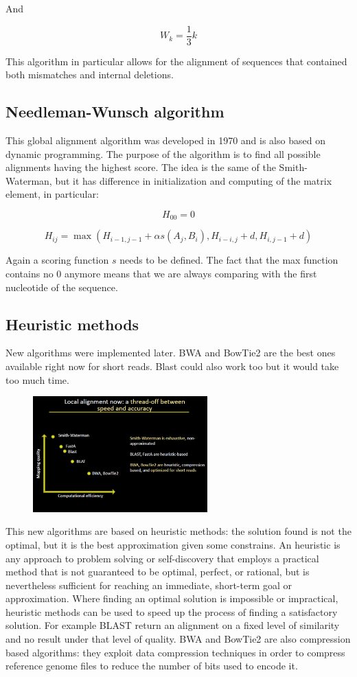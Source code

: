     And

    $$W_k = \frac{1}{3}k$$

    This algorithm in particular allows for the alignment of sequences that contained both mismatches and internal deletions.

    \subsection{Needleman-Wunsch algorithm}
    This global alignment algorithm was developed in 1970 and is also based on dynamic programming.
    The purpose of the algorithm is to find all possible alignments having the highest score.
    The idea is the same of the Smith-Waterman, but it has difference in initialization and computing of the matrix element, in particular:

    $$H_{00} = 0$$

    $$H_{ij} = \max(H_{i-1, j-1} + \alpha s(A_j, B_i), H_{i-i, j} + d, H_{i,j-1} + d)$$

    Again a scoring function $s$ needs to be defined.
    The fact that the max function contains no 0 anymore means that we are always comparing with the first nucleotide of the sequence.

    \subsection{Heuristic methods}
    New algorithms were implemented later.
    BWA and BowTie2 are the best ones available right now for short reads.
    Blast could also work too but it would take too much time.

    \begin{figure}[h]
    \centering
    \includegraphics[width=0.6\textwidth]{LocalAlignment.png}
    \caption{}
    \end{figure}

    This new algorithms are based on heuristic methods: the solution found is not the optimal, but it is the best approximation given some constrains.
    An heuristic is any approach to problem solving or self-discovery that employs a practical method that is not guaranteed to be optimal, perfect, or rational, but is nevertheless sufficient for reaching an immediate, short-term goal or approximation.
    Where finding an optimal solution is impossible or impractical, heuristic methods can be used to speed up the process of finding a satisfactory solution.
    For example BLAST return an alignment on a fixed level of similarity and no result under that level of quality.
    BWA and BowTie2 are also compression based algorithms: they exploit data compression techniques in order to compress reference genome files to reduce the number of bits used to encode it.

